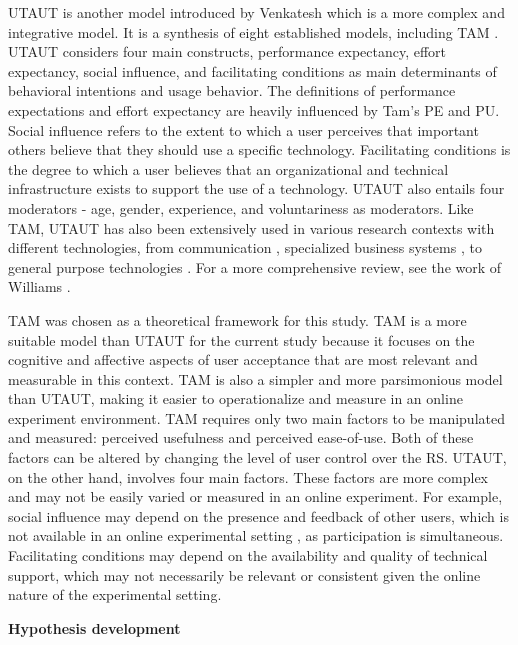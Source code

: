 \documentclass[a4paper,12pt]{article}
\newcommand{\citeyearonly}[1]{\citeyearpar{#1}}
\begin{document}
UTAUT is another model introduced by Venkatesh which is a more complex and integrative model. It is a synthesis of eight established models, including TAM \citep{venkatesh2003utaut}. UTAUT considers four main constructs, performance expectancy, effort expectancy, social influence, and facilitating conditions as main determinants of behavioral intentions and usage behavior. The definitions of performance expectations and effort expectancy are heavily influenced by Tam's PE and PU. Social influence refers to the extent to which a user perceives that important others believe that they should use a specific technology. Facilitating conditions is the degree to which a user believes that an organizational and technical infrastructure exists to support the use of a technology. UTAUT also entails four moderators - age, gender, experience, and voluntariness as moderators. Like TAM, UTAUT has also been extensively used in various research contexts with different technologies, from communication \citep{wu2007empirical}, specialized business systems \citep{kijsanayotin2009factors}, to general purpose technologies \citep{abu2010internet}. For a more comprehensive review, see the work of Williams \citeyearonly{williams2015unified}. 

TAM was chosen as a theoretical framework for this study. TAM is a more suitable model than UTAUT for the current study because it focuses on the cognitive and affective aspects of user acceptance that are most relevant and measurable in this context. TAM is also a simpler and more parsimonious model than UTAUT, making it easier to operationalize and measure in an online experiment environment. TAM requires only two main factors to be manipulated and measured: perceived usefulness and perceived ease-of-use. Both of these factors can be altered by changing the level of user control over the RS. UTAUT, on the other hand, involves four main factors. These factors are more complex and may not be easily varied or measured in an online experiment. For example, social influence may depend on the presence and feedback of other users, which is not available in an online experimental setting , as participation is simultaneous. Facilitating conditions may depend on the availability and quality of technical support, which may not necessarily be relevant or consistent given the online nature of the experimental setting.

\textbf{Hypothesis development}
\end{document}
